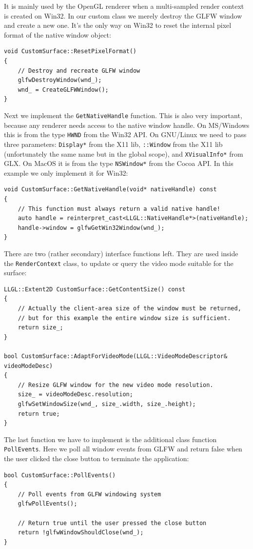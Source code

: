 \documentclass{article}
\begin{document}
It is mainly used by the OpenGL renderer when a multi-sampled render context is created on Win32.
In our custom class we merely destroy the GLFW window and create a new one.
It's the only way on Win32 to reset the internal pixel format of the native window object:
\begin{lstlisting}
void CustomSurface::ResetPixelFormat()
{
	// Destroy and recreate GLFW window
	glfwDestroyWindow(wnd_);
	wnd_ = CreateGLFWWindow();
}
\end{lstlisting}
Next we implement the \texttt{GetNativeHandle} function. This is also very important,
because any renderer needs access to the native window handle.
On MS/Windows this is from the type \texttt{HWND} from the Win32 API.
On GNU/Linux we need to pass three parameters: \texttt{Display*} from the X11 lib,
\texttt{::Window} from the X11 lib (unfortunately the same name but in the global scope),
and \texttt{XVisualInfo*} from GLX.
On MacOS it is from the type \texttt{NSWindow*} from the Cocoa API.
In this example we only implement it for Win32:
\begin{lstlisting}
void CustomSurface::GetNativeHandle(void* nativeHandle) const
{
	// This function must always return a valid native handle!
	auto handle = reinterpret_cast<LLGL::NativeHandle*>(nativeHandle);
	handle->window = glfwGetWin32Window(wnd_);
}
\end{lstlisting}
There are two (rather secondary) interface functions left.
They are used inside the \texttt{RenderContext} class, to update or query the video mode suitable for the surface:
\begin{lstlisting}
LLGL::Extent2D CustomSurface::GetContentSize() const
{
	// Actually the client-area size of the window must be returned,
	// but for this example the entire window size is sufficient.
	return size_;
}

bool CustomSurface::AdaptForVideoMode(LLGL::VideoModeDescriptor& videoModeDesc)
{
	// Resize GLFW window for the new video mode resolution.
	size_ = videoModeDesc.resolution;
	glfwSetWindowSize(wnd_, size_.width, size_.height);
	return true;
}
\end{lstlisting}
The last function we have to implement is the additional class function \texttt{PollEvents}.
Here we poll all window events from GLFW and return false when the user
clicked the close button to terminate the application:
\begin{lstlisting}
bool CustomSurface::PollEvents()
{
	// Poll events from GLFW windowing system
	glfwPollEvents();
	
	// Return true until the user pressed the close button
	return !glfwWindowShouldClose(wnd_);
}
\end{lstlisting}
\end{document}
